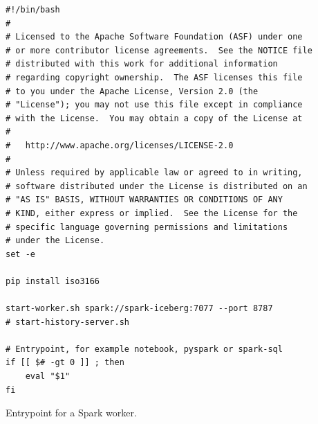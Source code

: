 \begin{listing}[H]
\begin{verbatim}
#!/bin/bash
#
# Licensed to the Apache Software Foundation (ASF) under one
# or more contributor license agreements.  See the NOTICE file
# distributed with this work for additional information
# regarding copyright ownership.  The ASF licenses this file
# to you under the Apache License, Version 2.0 (the
# "License"); you may not use this file except in compliance
# with the License.  You may obtain a copy of the License at
#
#   http://www.apache.org/licenses/LICENSE-2.0
#
# Unless required by applicable law or agreed to in writing,
# software distributed under the License is distributed on an
# "AS IS" BASIS, WITHOUT WARRANTIES OR CONDITIONS OF ANY
# KIND, either express or implied.  See the License for the
# specific language governing permissions and limitations
# under the License.
set -e

pip install iso3166

start-worker.sh spark://spark-iceberg:7077 --port 8787
# start-history-server.sh

# Entrypoint, for example notebook, pyspark or spark-sql
if [[ $# -gt 0 ]] ; then
    eval "$1"
fi
\end{verbatim}
\caption{Entrypoint for a Spark worker.}
\label{lst:spark-worker-entrypoint}
\end{listing}

